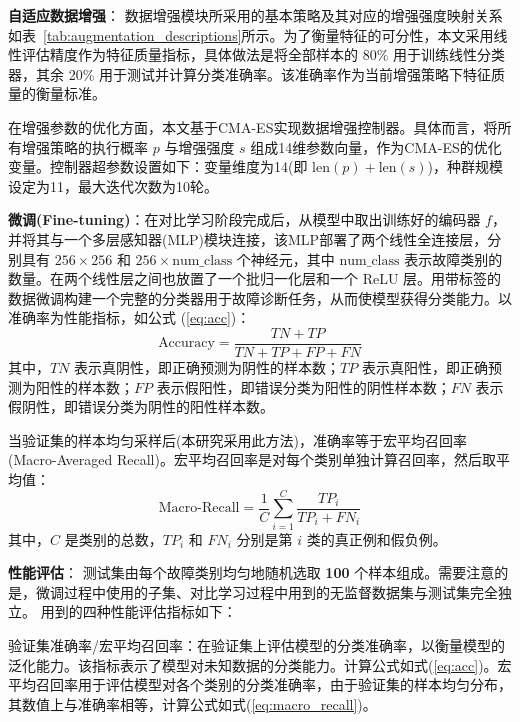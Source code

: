\documentclass[master]{thesis-uestc}
\begin{document}
\textbf{自适应数据增强}：  
数据增强模块所采用的基本策略及其对应的增强强度映射关系如表~\ref{tab:augmentation_descriptions}所示。为了衡量特征的可分性，本文采用线性评估精度作为特征质量指标，具体做法是将全部样本的 80\% 用于训练线性分类器，其余 20\% 用于测试并计算分类准确率。该准确率作为当前增强策略下特征质量的衡量标准。

在增强参数的优化方面，本文基于CMA-ES实现数据增强控制器。具体而言，将所有增强策略的执行概率 $p$ 与增强强度 $s$ 组成14维参数向量，作为CMA-ES的优化变量。控制器超参数设置如下：变量维度为14(即 $\text{len}(p) + \text{len}(s)$)，种群规模设定为11，最大迭代次数为10轮。

\textbf{微调(Fine-tuning)}：在对比学习阶段完成后，从模型中取出训练好的编码器 \( f \)，并将其与一个多层感知器(MLP)模块连接，该MLP部署了两个线性全连接层，分别具有 \( 256 \times 256 \) 和 \( 256 \times \text{num\_class} \) 个神经元，其中 \(\text{num\_class}\) 表示故障类别的数量。在两个线性层之间也放置了一个批归一化层和一个 ReLU 层。用带标签的数据微调构建一个完整的分类器用于故障诊断任务，从而使模型获得分类能力。以准确率为性能指标，如公式 (\ref{eq:acc})：
    \begin{equation}
        \text{Accuracy} = \frac{TN + TP}{TN + TP + FP + FN}
        \label{eq:acc}
    \end{equation}
    其中，\( TN \) 表示真阴性，即正确预测为阴性的样本数；\( TP \) 表示真阳性，即正确预测为阳性的样本数；\( FP \) 表示假阳性，即错误分类为阳性的阴性样本数；\( FN \) 表示假阴性，即错误分类为阴性的阳性样本数。
    
    当验证集的样本均匀采样后(本研究采用此方法)，准确率等于宏平均召回率(Macro-Averaged Recall)。宏平均召回率是对每个类别单独计算召回率，然后取平均值：
    \begin{equation}
        \text{Macro-Recall} = \frac{1}{C} \sum_{i=1}^{C} \frac{TP_i}{TP_i + FN_i}
        \label{eq:macro_recall}
    \end{equation}
    其中，\( C \) 是类别的总数，\( TP_i \) 和 \( FN_i \) 分别是第 \( i \) 类的真正例和假负例。
    
\textbf{性能评估}：  
    测试集由每个故障类别均匀地随机选取 \textbf{100} 个样本组成。需要注意的是，微调过程中使用的子集、对比学习过程中用到的无监督数据集与测试集完全独立。  
    用到的四种性能评估指标如下：
    
    验证集准确率/宏平均召回率：在验证集上评估模型的分类准确率，以衡量模型的泛化能力。该指标表示了模型对未知数据的分类能力。计算公式如式(\ref{eq:acc})。宏平均召回率用于评估模型对各个类别的分类准确率，由于验证集的样本均匀分布，其数值上与准确率相等，计算公式如式(\ref{eq:macro_recall})。
    
\end{document}
